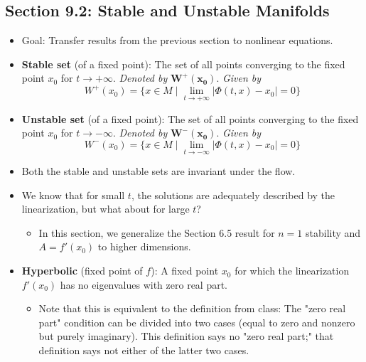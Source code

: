 \documentclass[../notes.tex]{subfiles}
\begin{document}
\subsection*{Section 9.2: Stable and Unstable Manifolds}
\begin{itemize}
    \item Goal: Transfer results from the previous section to nonlinear equations.
    \item \textbf{Stable set} (of a fixed point): The set of all points converging to the fixed point $x_0$ for $t\to +\infty$. \emph{Denoted by} $\bm{W^+(x_0)}$. \emph{Given by}
    \begin{equation*}
        W^+(x_0) = \{x\in M\mid\lim_{t\to +\infty}|\Phi(t,x)-x_0|=0\}
    \end{equation*}
    \item \textbf{Unstable set} (of a fixed point): The set of all points converging to the fixed point $x_0$ for $t\to -\infty$. \emph{Denoted by} $\bm{W^-(x_0)}$. \emph{Given by}
    \begin{equation*}
        W^-(x_0) = \{x\in M\mid\lim_{t\to -\infty}|\Phi(t,x)-x_0|=0\}
    \end{equation*}
    \item Both the stable and unstable sets are invariant under the flow.
    \item We know that for small $t$, the solutions are adequately described by the linearization, but what about for large $t$?
    \begin{itemize}
        \item In this section, we generalize the Section 6.5 result for $n=1$ stability and $A=f'(x_0)$ to higher dimensions.
    \end{itemize}
    \item \textbf{Hyperbolic} (fixed point of $f$): A fixed point $x_0$ for which the linearization $f'(x_0)$ has no eigenvalues with zero real part.
    \begin{itemize}
        \item Note that this is equivalent to the definition from class: The "zero real part" condition can be divided into two cases (equal to zero and nonzero but purely imaginary). This definition says no "zero real part;" that definition says not either of the latter two cases.
    \end{itemize}
\end{itemize}
\end{document}

